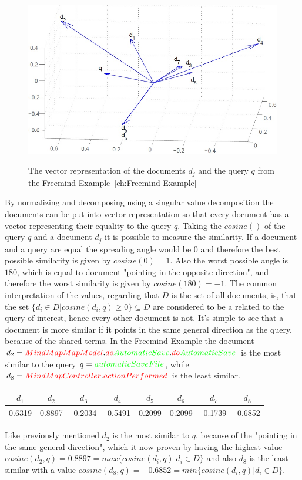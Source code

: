 \begin{figure}
  \centering
  \includegraphics[width=\linewidth]{src/pic/lsf-vectors}
  \label{pic:lsi_vectors}
  \caption{The vector representation of the documents $d_j$ and the query $q$ from the Freemind Example~\ref{ch:Freemind Example}}
\end{figure}
By normalizing and decomposing using a singular value decomposition the documents can be put into vector representation so that every document has a vector representing their equality to the query $q$. Taking the $cosine()$ of the query $q$ and a document $d_j$ it is possible to measure the similarity. If a document and a query are equal the spreading angle would be $0$ and therefore the best possible similarity is given by $cosine(0)=1$. Also the worst possible angle is $180$, which is equal to document "pointing in the opposite direction", and therefore the worst similarity is given by $cosine(180)=-1$. The common interpretation of the values, regarding that $D$ is the set of all documents, is, that the set $\{d_i \in D| cosine(d_i,q) \ge 0 \} \subseteq D$ are considered to be a related to the query of interest, hence every other document is not. It's simple to see that a document is more similar if it points in the same general direction as the query, because of the shared terms. In the Freemind Example the document $d_2=\color{red}MindMapMapModel\color{black}.\color{red}do\color{green}AutomaticSave\color{black}.\color{red}do\color{green}AutomaticSave\color{black}$ is the most similar to the query $q=\color{green}automaticSaveFile\color{black}$, while $d_8=\color{red}MindMapController\color{black}.\color{red}actionPerformed\color{black}$ is the least similar.
\begin{center}
  \begin{tabular}{ c c c c c c c c }
    \hline
    $d_1$ & $d_2$ & $d_3$ & $d_4$ & $d_5$ & $d_6$ & $d_7$ & $d_8$ \\ \hline
    0.6319 & 0.8897 & -0.2034 & -0.5491 & 0.2099 & 0.2099 & -0.1739 & -0.6852 \\ \hline
  \end{tabular}
\end{center}
Like previously mentioned $d_2$ is the most similar to $q$, because of the "pointing in the same general direction", which it now proven by having the highest value $cosine(d_2,q)=0.8897=max \{ cosine(d_i,q) | d_i \in D \} $ and also $d_8$ is the least similar with a value $cosine(d_8,q)=-0.6852=min\{cosine(d_i,q) | d_i \in D\}$.
  
